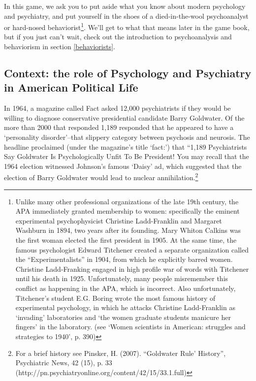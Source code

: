\begin{refsection}
In this game, we ask you to put aside what you know about modern psychology and psychiatry, and put yourself in the shoes of a died-in-the-wool psychoanalyst or hard-nosed behaviorist\footnote{Unlike many other professional organizations of the late 19th century, the APA immediately granted membership to women: specifically the eminent experimental psychophysicist Christine Ladd-Franklin and Margaret Washburn in 1894, two years after its founding. Mary Whiton Calkins was the first woman elected the first president in 1905.⁠
At the same time, the famous psychologist Edward Titchener created a separate organization called the “Experimentalists” in 1904, from which he explicitly barred women. Christine Ladd-Franking engaged in high profile war of words with Titchener until his death in 1925. Unfortunately, many people misremember this conflict as happening in the APA, which is incorrect. Also unfortunately, Titchener's student E.G. Boring wrote the most famous history of experimental psychology, in which he attacks Christine Ladd-Franklin as `invading' laboratories and `the women graduate students manicure her fingers' in the laboratory. (see `Women scientists in American: struggles and strategies to 1940', p. 390)}. We’ll get to what that means later in the game book, but if you just can’t wait, check out the introduction to psychoanalysis and behaviorism in section \ref{behaviorists}.

\subsection{Context: the role of Psychology and Psychiatry in American Political Life}
\label{context:theroleofpsychologyandpsychiatryinamericanpoliticallife}

In 1964, a magazine called Fact asked 12,000 psychiatrists if they would be willing to diagnose conservative presidential candidate Barry Goldwater. Of the more than 2000 that responded 1,189 responded that he appeared to have a `personality disorder'--that slippery category between psychosis and neurosis. The headline proclaimed (under the magazine's title `fact:') that “1,189 Psychiatrists Say Goldwater Is Psychologically Unfit To Be President! You may recall that the 1964 election witnessed Johnson's famous `Daisy' ad, which suggested that the election of Barry Goldwater would lead to nuclear annihilation.\footnote{For a brief history see Pinsker, H. (2007). “Goldwater Rule' History”, Psychiatric News, 42 (15), p. 33 (http:\slash \slash pn.psychiatryonline.org\slash content\slash 42\slash 15\slash 33.1.full)} \begin{marginfigure}
 \begin{center}


\end{center}
\end{marginfigure}
\end{refsection}
